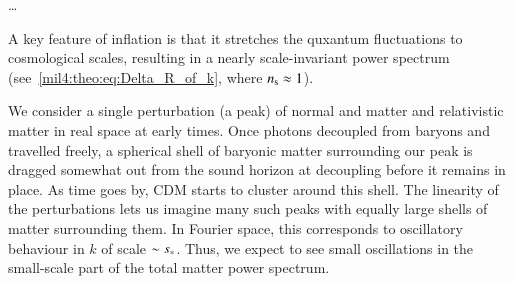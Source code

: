     \dots

    A key feature of inflation is that it stretches the quxantum fluctuations to cosmological scales, resulting in a nearly scale-invariant power spectrum (see~\cref{mil4:theo:eq:Delta_R_of_k}, where $n_\mathrm{s}\approx 1$). 

    We consider a single perturbation (a peak) of normal and matter and relativistic matter in real space at early times. Once photons decoupled from baryons and travelled freely, a spherical shell of baryonic matter surrounding our peak is dragged somewhat out from the sound horizon at decoupling before it remains in place. As time goes by, CDM starts to cluster around this shell. The linearity of the perturbations lets us imagine many such peaks with equally large shells of matter surrounding them. In Fourier space, this corresponds to oscillatory behaviour in $k$ of scale $\sim s_*$. Thus, we expect to see small oscillations in the small-scale part of the total matter power spectrum.



    
    




    
